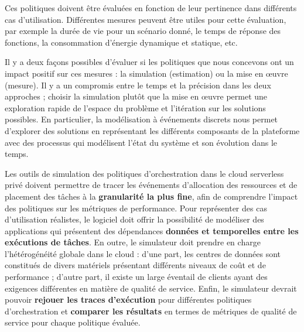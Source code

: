 Ces politiques doivent être évaluées en fonction de leur pertinence dans différents cas d'utilisation. Différentes mesures peuvent être utiles pour cette évaluation, par exemple la durée de vie pour un scénario donné, le temps de réponse des fonctions, la consommation d'énergie dynamique et statique, etc.

Il y a deux façons possibles d'évaluer si les politiques que nous concevons ont un impact positif sur ces mesures : la simulation (estimation) ou la mise en œuvre (mesure). Il y a un compromis entre le temps et la précision dans les deux approches ; choisir la simulation plutôt que la mise en œuvre permet une exploration rapide de l'espace du problème et l'itération sur les solutions possibles. En particulier, la modélisation à événements discrets nous permet d'explorer des solutions en représentant les différents composants de la plateforme avec des processus qui modélisent l'état du système et son évolution dans le temps.

Les outils de simulation des politiques d'orchestration dans le cloud serverless privé doivent permettre de tracer les événements d'allocation des ressources et de placement des tâches à la \textbf{granularité la plus fine}, afin de comprendre l'impact des politiques sur les métriques de performance. Pour représenter des cas d'utilisation réalistes, le logiciel doit offrir la possibilité de modéliser des applications qui présentent des dépendances \textbf{données et temporelles entre les exécutions de tâches}. En outre, le simulateur doit prendre en charge l'hétérogénéité globale dans le cloud : d'une part, les centres de données sont constitués de divers matériels présentant différents niveaux de coût et de performance ; d'autre part, il existe un large éventail de clients ayant des exigences différentes en matière de qualité de service. Enfin, le simulateur devrait pouvoir \textbf{rejouer les traces d'exécution} pour différentes politiques d'orchestration et \textbf{comparer les résultats} en termes de métriques de qualité de service pour chaque politique évaluée.

